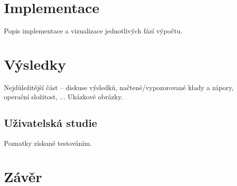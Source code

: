 \documentclass[11pt,a4paper,oneside]{article}
\begin{document}
	\section{Implementace}
	Popis implementace a vizualizace jednotlivých fází výpočtu.

	\section{Výsledky}
	Nejdůležitější část -- diskuse výsledků, 
	načtené/vypozorované klady a zápory, operační složitost, ...
	Ukázkové obrázky.

	\subsection{Uživatelská studie}
	Poznatky získané testováním.

	\section{Závěr}

	
	
\end{document}
